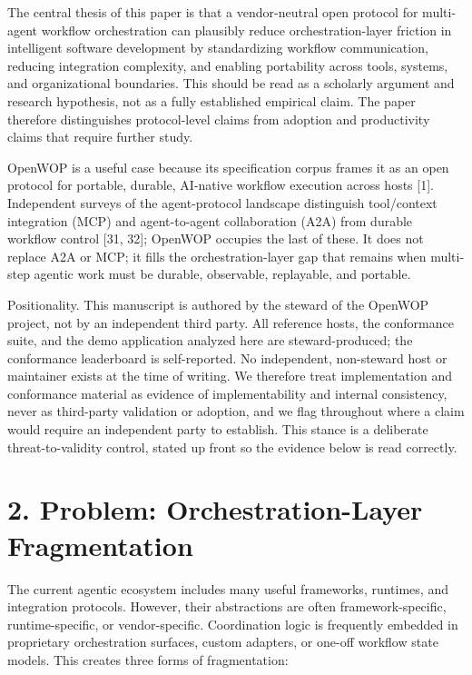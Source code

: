 \documentclass[11pt]{article}
\begin{document}
The central thesis of this paper is that a vendor-neutral open protocol for multi-agent workflow orchestration can plausibly reduce orchestration-layer friction in intelligent software development by standardizing workflow communication, reducing integration complexity, and enabling portability across tools, systems, and organizational boundaries. This should be read as a scholarly argument and research hypothesis, not as a fully established empirical claim. The paper therefore distinguishes protocol-level claims from adoption and productivity claims that require further study.

OpenWOP is a useful case because its specification corpus frames it as an open protocol for portable, durable, AI-native workflow execution across hosts [1]. Independent surveys of the agent-protocol landscape distinguish tool/context integration (MCP) and agent-to-agent collaboration (A2A) from durable workflow control [31, 32]; OpenWOP occupies the last of these. It does not replace A2A or MCP; it fills the orchestration-layer gap that remains when multi-step agentic work must be durable, observable, replayable, and portable.

Positionality. This manuscript is authored by the steward of the OpenWOP project, not by an independent third party. All reference hosts, the conformance suite, and the demo application analyzed here are steward-produced; the conformance leaderboard is self-reported. No independent, non-steward host or maintainer exists at the time of writing. We therefore treat implementation and conformance material as evidence of implementability and internal consistency, never as third-party validation or adoption, and we flag throughout where a claim would require an independent party to establish. This stance is a deliberate threat-to-validity control, stated up front so the evidence below is read correctly.

\section*{2. Problem: Orchestration-Layer Fragmentation}
The current agentic ecosystem includes many useful frameworks, runtimes, and integration protocols. However, their abstractions are often framework-specific, runtime-specific, or vendor-specific. Coordination logic is frequently embedded in proprietary orchestration surfaces, custom adapters, or one-off workflow state models. This creates three forms of fragmentation:
\end{document}
